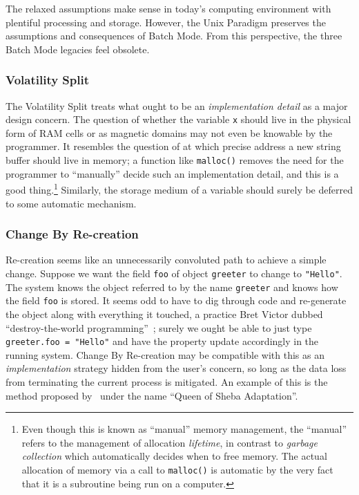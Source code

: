\documentclass[ twoside,openright,titlepage,numbers=noenddot,headinclude,footinclude,cleardoublepage=empty,abstract=on,
                BCOR=5mm,paper=a4,fontsize=11pt
                ]{scrreprt}
\theoremstyle{definition}
\begin{document}
The relaxed assumptions make sense in today's computing environment with
plentiful processing and storage. However, the Unix Paradigm preserves
the assumptions and consequences of Batch Mode. From this perspective,
the three Batch Mode legacies feel obsolete.

\hypertarget{volatility-split}{\subsubsection{Volatility Split}\label{volatility-split}}

The Volatility Split treats what ought to be an \emph{implementation
detail} as a major design concern. The question of whether the variable
\texttt{x} should live in the physical form of RAM cells or as magnetic
domains may not even be knowable by the programmer. It resembles the
question of at which precise address a new string buffer should live in
memory; a function like \texttt{malloc()} removes the need for the
programmer to ``manually'' decide such an implementation detail, and
this is a good thing.\footnote{Even though this is known as ``manual''
  memory management, the ``manual'' refers to the management of
  allocation \emph{lifetime}, in contrast to \emph{garbage collection}
  which automatically decides when to free memory. The actual allocation
  of memory via a call to \texttt{malloc()} is automatic by the very
  fact that it is a subroutine being run on a computer.} Similarly, the
storage medium of a variable should surely be deferred to some automatic
mechanism.

\hypertarget{change-by-re-creation}{\subsubsection{Change By Re-creation}\label{change-by-re-creation}}

Re-creation seems like an unnecessarily convoluted path to achieve a
simple change. Suppose we want the field \texttt{foo} of object
\texttt{greeter} to change to \texttt{"Hello"}. The system knows the
object referred to by the name \texttt{greeter} and knows how the field
\texttt{foo} is stored. It seems odd to have to dig through code and
re-generate the object along with everything it touched, a practice Bret
Victor dubbed ``destroy-the-world programming''~\parencite{BretVictor};
surely we ought be able to just type \texttt{greeter.foo\ =\ "Hello"}
and have the property update accordingly in the running system. Change
By Re-creation may be compatible with this as an \emph{implementation}
strategy hidden from the user's concern, so long as the data loss from
terminating the current process is mitigated. An example of this is the
method proposed by~\textcite{Externalize} under the name ``Queen of
Sheba Adaptation''.
\end{document}
